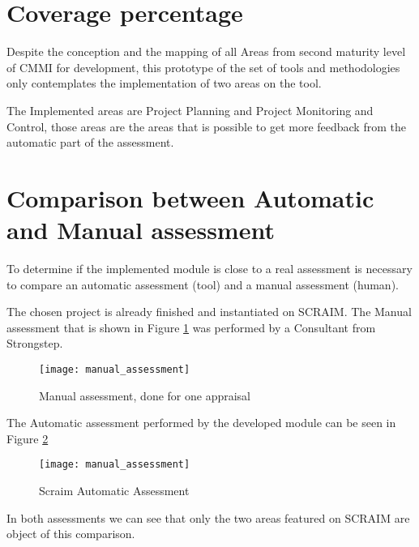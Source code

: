 \section{Coverage percentage} \label{sec:coverage}



Despite the conception and the mapping of all Areas from second maturity level of CMMI for development, this prototype of the set of tools and methodologies only contemplates the implementation of two areas on the tool.

The Implemented areas are Project Planning and Project Monitoring and Control, those areas are the areas that is possible to get more feedback from the automatic part of the assessment. 
 
\section{Comparison between Automatic and Manual assessment} \label{sec:automatic}

To determine if the implemented module is close to a real assessment is necessary to compare an automatic assessment (tool) and a manual assessment (human).

The chosen project is already finished and instantiated on SCRAIM.
The Manual assessment that is shown in Figure \ref{fig:manual_assessment} was performed by a Consultant from Strongstep.

\begin{figure}[h]
	\begin{center}
		\leavevmode
		\texttt{[image: manual\_assessment]}
		\caption{Manual assessment, done for one appraisal}
		\label{fig:manual_assessment}
	\end{center}
\end{figure}

The Automatic assessment performed by the developed module can be seen in Figure \ref{fig:automatic_assessment}

\begin{figure}[h]
	\begin{center}
		\leavevmode
		\texttt{[image: manual\_assessment]}
		\caption{Scraim Automatic Assessment}
		\label{fig:automatic_assessment}
	\end{center}
\end{figure}

In both assessments we can see that only the two areas featured on SCRAIM are object of this comparison.